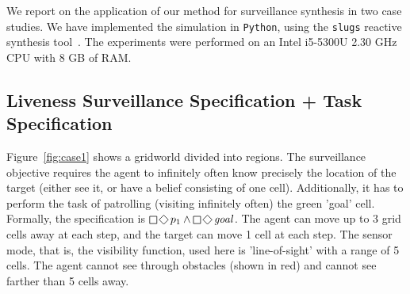 We report on the application of our method for surveillance synthesis in two case studies. We have implemented the simulation in \texttt{Python}, using the \texttt{slugs} reactive synthesis tool~\cite{EhlersR16}. The experiments were performed on an Intel i5-5300U 2.30 GHz CPU with 8 GB of RAM. 


\subsection{Liveness Surveillance Specification + Task Specification}
Figure~\ref{fig:case1} shows a gridworld divided into  regions. The surveillance objective requires the agent to infinitely often know precisely the location of the target (either see it, or have a belief consisting of one cell). Additionally, it has to perform the task of patrolling (visiting infinitely often) the green 'goal' cell. Formally, the specification is $\LTLglobally\LTLfinally p_1 \wedge \LTLglobally\LTLfinally \mathit{goal}$. The agent can move up to 3 grid cells away at each step, and the target can move 1 cell at each step. The sensor mode, that is, the visibility function, used here is 'line-of-sight' with a range of 5 cells. The agent cannot see through obstacles (shown in red) and cannot see farther than 5 cells away. 


